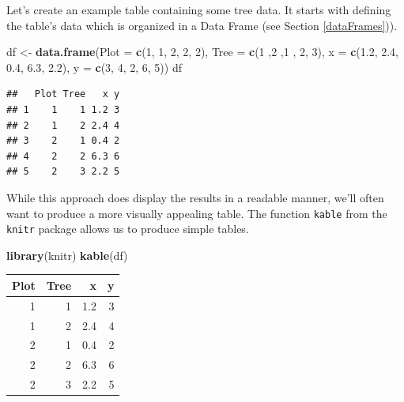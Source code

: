 \documentclass[
]{krantz}
\newenvironment{Shaded}{\begin{snugshade}}{\end{snugshade}}
\newcommand{\DataTypeTok}[1]{\textcolor[rgb]{0.13,0.29,0.53}{#1}}
\newcommand{\DecValTok}[1]{\textcolor[rgb]{0.00,0.00,0.81}{#1}}
\newcommand{\FloatTok}[1]{\textcolor[rgb]{0.00,0.00,0.81}{#1}}
\newcommand{\KeywordTok}[1]{\textcolor[rgb]{0.13,0.29,0.53}{\textbf{#1}}}
\newcommand{\NormalTok}[1]{#1}
\newcommand{\StringTok}[1]{\textcolor[rgb]{0.31,0.60,0.02}{#1}}
\begin{document}
Let's create an example table containing some tree data. It starts with defining the table's data which is organized in a Data Frame (see Section \ref{dataFrames})).

\begin{Shaded}
\begin{Highlighting}[]
\NormalTok{df \textless{}{-}}\StringTok{ }\KeywordTok{data.frame}\NormalTok{(}\DataTypeTok{Plot =} \KeywordTok{c}\NormalTok{(}\DecValTok{1}\NormalTok{, }\DecValTok{1}\NormalTok{, }\DecValTok{2}\NormalTok{, }\DecValTok{2}\NormalTok{, }\DecValTok{2}\NormalTok{),}
                  \DataTypeTok{Tree =} \KeywordTok{c}\NormalTok{(}\DecValTok{1}\NormalTok{ ,}\DecValTok{2}\NormalTok{ ,}\DecValTok{1}\NormalTok{ , }\DecValTok{2}\NormalTok{, }\DecValTok{3}\NormalTok{),}
                  \DataTypeTok{x =} \KeywordTok{c}\NormalTok{(}\FloatTok{1.2}\NormalTok{, }\FloatTok{2.4}\NormalTok{, }\FloatTok{0.4}\NormalTok{, }\FloatTok{6.3}\NormalTok{, }\FloatTok{2.2}\NormalTok{),}
                  \DataTypeTok{y =} \KeywordTok{c}\NormalTok{(}\DecValTok{3}\NormalTok{, }\DecValTok{4}\NormalTok{, }\DecValTok{2}\NormalTok{, }\DecValTok{6}\NormalTok{, }\DecValTok{5}\NormalTok{))}
\NormalTok{df}
\end{Highlighting}
\end{Shaded}

\begin{verbatim}
##   Plot Tree   x y
## 1    1    1 1.2 3
## 2    1    2 2.4 4
## 3    2    1 0.4 2
## 4    2    2 6.3 6
## 5    2    3 2.2 5
\end{verbatim}

While this approach does display the results in a readable manner, we'll often want to produce a more visually appealing table. The function \texttt{kable} from the \texttt{knitr} package allows us to produce simple tables.

\begin{Shaded}
\begin{Highlighting}[]
\KeywordTok{library}\NormalTok{(knitr)}
\KeywordTok{kable}\NormalTok{(df)}
\end{Highlighting}
\end{Shaded}

\begin{tabular}{r|r|r|r}
\hline
Plot & Tree & x & y\\
\hline
1 & 1 & 1.2 & 3\\
\hline
1 & 2 & 2.4 & 4\\
\hline
2 & 1 & 0.4 & 2\\
\hline
2 & 2 & 6.3 & 6\\
\hline
2 & 3 & 2.2 & 5\\
\hline
\end{tabular}
\end{document}
